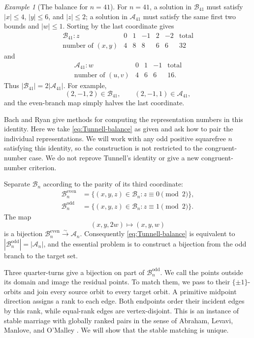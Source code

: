 \documentclass[11pt]{amsart}
\theoremstyle{definition}
\theoremstyle{remark}
\newtheorem{example}[theorem]{Example}
\newcommand{\Bn}{\mathcal B_n}
\newcommand{\An}{\mathcal A_n}
\newcommand{\Bodd}{\mathcal B_n^{\mathrm{odd}}}
\newcommand{\Beven}{\mathcal B_n^{\mathrm{even}}}
\begin{document}
\begin{example}[The balance for $n=41$]\label{ex:balance-41}
For $n=41$, a solution in $\mathcal B_{41}$ must satisfy
$|x|\le4$, $|y|\le6$, and $|z|\le2$; a solution in $\mathcal A_{41}$ must
satisfy the same first two bounds and $|w|\le1$.  Sorting by the last
coordinate gives
\[
\begin{array}{c|ccccc|c}
\mathcal B_{41}:z&0&1&-1&2&-2&\text{total}\\ \hline
\text{number of }(x,y)&4&8&8&6&6&32
\end{array}
\]
and
\[
\begin{array}{c|ccc|c}
\mathcal A_{41}:w&0&1&-1&\text{total}\\ \hline
\text{number of }(u,v)&4&6&6&16.
\end{array}
\]
Thus $|\mathcal B_{41}|=2|\mathcal A_{41}|$.  For example,
\[
 (2,-1,2)\in\mathcal B_{41},
 \qquad
 (2,-1,1)\in\mathcal A_{41},
\]
and the even-branch map simply halves the last coordinate.
\end{example}

Bach and Ryan \cite{BachRyan} give methods for computing the representation
numbers in this identity.  Here we take \eqref{eq:Tunnell-balance} as given
and ask how to pair the individual representations.  We will work with any
odd positive squarefree $n$ satisfying this identity, so the construction is
not restricted to the congruent-number case.  We do not reprove Tunnell's
identity or give a new congruent-number criterion.

Separate $\Bn$ according to the parity of its third coordinate:
\begin{align*}
 \Beven&=\{(x,y,z)\in\Bn:z\equiv0\pmod2\},\\
 \Bodd&=\{(x,y,z)\in\Bn:z\equiv1\pmod2\}.
\end{align*}
The map
\begin{equation}\label{eq:even-branch}
 (x,y,2w)\longmapsto(x,y,w)
\end{equation}
is a bijection $\Beven\xrightarrow{\sim}\An$.  Consequently
\eqref{eq:Tunnell-balance} is equivalent to $|\Bodd|=|\An|$, and the
essential problem is to construct a bijection from the odd branch to the
target set.

Three quarter-turns give a bijection on part of $\Bodd$.  We call the points
outside its domain and image the residual points.  To match them, we pass
to their $\{\pm1\}$-orbits and join every source orbit to every target orbit.
A primitive midpoint direction assigns a rank to each edge.  Both endpoints
order their incident edges by this rank, while equal-rank edges are
vertex-disjoint.  This is an instance of stable marriage with globally ranked
pairs in the sense of Abraham, Levavi, Manlove, and O'Malley
\cite{AbrahamEtAl}.  We will show that the stable matching is unique.
\end{document}
